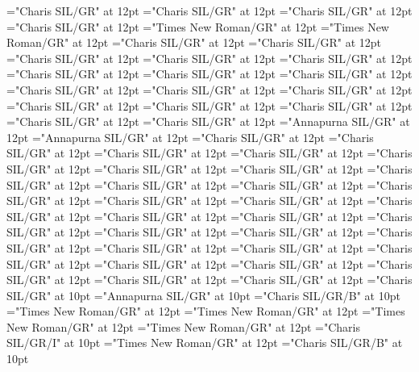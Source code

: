 \documentclass[a4paper]{article}
\begin{document}
\pagestyle{plain}
\sloppy
\setlength{\parfillskip}{0pt plus 1fil}
\font\divbn="Charis SIL/GR" at 12pt
\font\spanbn="Charis SIL/GR" at 12pt
\font\divde="Charis SIL/GR" at 12pt
\font\spande="Charis SIL/GR" at 12pt
\font\diven="Times New Roman/GR" at 12pt
\font\spanen="Times New Roman/GR" at 12pt
\font\dives="Charis SIL/GR" at 12pt
\font\spanes="Charis SIL/GR" at 12pt
\font\divfa="Charis SIL/GR" at 12pt
\font\spanfa="Charis SIL/GR" at 12pt
\font\divfr="Charis SIL/GR" at 12pt
\font\spanfr="Charis SIL/GR" at 12pt
\font\divggoINxaheri="Charis SIL/GR" at 12pt
\font\spanggoINxaheri="Charis SIL/GR" at 12pt
\font\divggoTeluIN="Charis SIL/GR" at 12pt
\font\spanggoTeluIN="Charis SIL/GR" at 12pt
\font\divggofonipaxemic="Charis SIL/GR" at 12pt
\font\spanggofonipaxemic="Charis SIL/GR" at 12pt
\font\divgrc="Charis SIL/GR" at 12pt
\font\spangrc="Charis SIL/GR" at 12pt
\font\divhbo="Charis SIL/GR" at 12pt
\font\spanhbo="Charis SIL/GR" at 12pt
\font\divhi="Annapurna SIL/GR" at 12pt
\font\spanhi="Annapurna SIL/GR" at 12pt
\font\divid="Charis SIL/GR" at 12pt
\font\spanid="Charis SIL/GR" at 12pt
\font\divkm="Charis SIL/GR" at 12pt
\font\spankm="Charis SIL/GR" at 12pt
\font\divko="Charis SIL/GR" at 12pt
\font\spanko="Charis SIL/GR" at 12pt
\font\divlv="Charis SIL/GR" at 12pt
\font\spanlv="Charis SIL/GR" at 12pt
\font\divms="Charis SIL/GR" at 12pt
\font\spanms="Charis SIL/GR" at 12pt
\font\divne="Charis SIL/GR" at 12pt
\font\spanne="Charis SIL/GR" at 12pt
\font\divpt="Charis SIL/GR" at 12pt
\font\spanpt="Charis SIL/GR" at 12pt
\font\divru="Charis SIL/GR" at 12pt
\font\spanru="Charis SIL/GR" at 12pt
\font\divseh="Charis SIL/GR" at 12pt
\font\spanseh="Charis SIL/GR" at 12pt
\font\divte="Charis SIL/GR" at 12pt
\font\spante="Charis SIL/GR" at 12pt
\font\divth="Charis SIL/GR" at 12pt
\font\spanth="Charis SIL/GR" at 12pt
\font\divtr="Charis SIL/GR" at 12pt
\font\spantr="Charis SIL/GR" at 12pt
\font\divvi="Charis SIL/GR" at 12pt
\font\spanvi="Charis SIL/GR" at 12pt
\font\divzhCN="Charis SIL/GR" at 12pt
\font\spanzhCN="Charis SIL/GR" at 12pt
\font\xitemte="Charis SIL/GR" at 10pt
\font\xitemhi="Annapurna SIL/GR" at 10pt
\font\xitemxitemcomplexformformbefore="Charis SIL/GR/B" at 10pt
\font\xitemxitemcomplexformrefsbefore="Times New Roman/GR" at 12pt
\font\xitemxitemdefinitionbefore="Times New Roman/GR" at 12pt
\font\xitemxitementryrefcomponentbefore="Times New Roman/GR" at 12pt
\font\xitemxitementryreftypebefore="Times New Roman/GR" at 12pt
\font\xitemxitemexamplebefore="Charis SIL/GR/I" at 10pt
\font\xitemxitemexamplesbefore="Times New Roman/GR" at 12pt
\font\xitemxitemheadwordbefore="Charis SIL/GR/B" at 10pt
\end{document}
